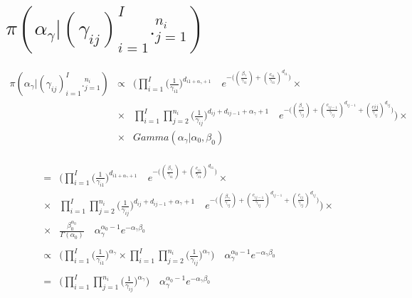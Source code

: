 \documentclass[10pt]{report}
\theoremstyle{plain}
\begin{document}
\section{$\pi(\alpha_\gamma|(\gamma_{ij})_{i=1}^I._{j=1}^{n_i})$}
\begin{eqnarray*}
\pi(\alpha_\gamma|(\gamma_{ij})_{i=1}^I._{j=1}^{n_i}) &\propto& \Bigg(\prod_{i=1}^I \bigg(\frac{1}{\gamma_{i1}}\bigg)^{d_{i1+\alpha_\gamma+1}}\quad e^{-\big((\frac{\beta_\gamma}{\gamma_{i1}})+(\frac{c_{i1}}{\gamma_{i1}})^{d_{i1}}\big)}\times\\
&\times& \prod_{i=1}^I \prod_{j=2}^{n_i} \bigg(\frac{1}{\gamma_{ij}}\bigg)^{d_{ij}+d_{ij-1}+\alpha_\gamma+1}\quad e^{-\big((\frac{\beta_\gamma}{\gamma_{ij}})+(\frac{c_{ij-1}}{\gamma_{ij}})^{d_{ij-1}}+(\frac{c_{}ij}{\gamma_{ij}})^{d_{ij}}\big)}\Bigg)\times \\
&\times& Gamma(\alpha_\gamma|\alpha_0,\beta_0)
\end{eqnarray*}
\\
\begin{eqnarray*}
&=&\Bigg(\prod_{i=1}^I \bigg(\frac{1}{\gamma_{i1}}\bigg)^{d_{i1+\alpha_\gamma+1}}\quad e^{-\big((\frac{\beta_\gamma}{\gamma_{i1}})+(\frac{c_{i1}}{\gamma_{i1}})^{d_{i1}}\big)}\times\\
&\times& \prod_{i=1}^I \prod_{j=2}^{n_i} \bigg(\frac{1}{\gamma_{ij}}\bigg)^{d_{ij}+d_{ij-1}+\alpha_\gamma+1}\quad e^{-\big((\frac{\beta_\gamma}{\gamma_{ij}})+(\frac{c_{ij-1}}{\gamma_{ij}})^{d_{ij-1}}+(\frac{c_{ij}}{\gamma_{ij}})^{d_{ij}}\big)}\Bigg)\times \\
&\times& \frac{\beta_0^{\alpha_0}}{\Gamma(\alpha_0)} \quad \alpha_\gamma^{\alpha_0-1} e^{-\alpha_\gamma\beta_0}\\
\\
&\propto& \Bigg(\prod_{i=1}^I \Big(\frac{1}{\gamma_{i1}}\Big)^{\alpha_\gamma} \times \prod_{i=1}^I \prod_{j=2}^{n_i}\Big(\frac{1}{\gamma_{ij}}\Big)^{\alpha_\gamma}\Bigg)\quad \alpha_\gamma^{\alpha_0-1}e^{-\alpha_\gamma\beta_0}\\
\\
&=&\Bigg(\prod_{i=1}^I \prod_{j=1}^{n_i} \Big(\frac{1}{\gamma_{ij}}\Big)^{\alpha_\gamma}\Bigg) \quad \alpha_\gamma^{\alpha_0-1}e^{-\alpha_\gamma\beta_0}
\end{eqnarray*}
\\
\\
\\
\end{document}
